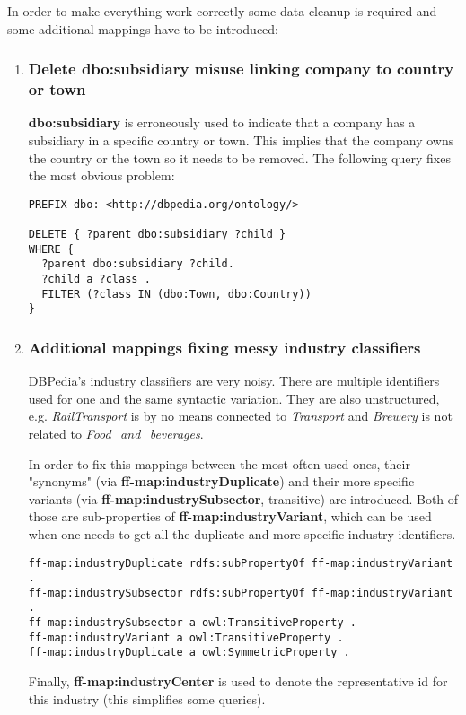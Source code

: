 In order to make everything work correctly some data cleanup is required and some additional mappings have to be introduced:
\begin{enumerate}
    \item \subsubsection {Delete dbo:subsidiary misuse linking company to country or town}
    
    \textbf{dbo:subsidiary} is erroneously used to indicate that a company has a subsidiary in a specific country or town. This implies that the company owns the country or the town so it needs to be removed. The following query fixes the most obvious problem:
    
\begin{verbatim}
PREFIX dbo: <http://dbpedia.org/ontology/>

DELETE { ?parent dbo:subsidiary ?child }
WHERE {
  ?parent dbo:subsidiary ?child.
  ?child a ?class .
  FILTER (?class IN (dbo:Town, dbo:Country))
}
\end{verbatim}

    \item \subsubsection{Additional mappings fixing messy industry classifiers}
    DBPedia's industry classifiers are very noisy. There are multiple identifiers used for one and the same syntactic variation. They are also unstructured, e.g. \textit{RailTransport} is by no means connected to \textit{Transport} and \textit{Brewery} is not related to \textit{Food\_and\_beverages}.
    
    In order to fix this mappings between the most often used ones, their "synonyms" (via \textbf{ff-map:industryDuplicate}) and their more specific variants (via \textbf{ff-map:industrySubsector}, transitive) are introduced. Both of those are sub-properties of \textbf{ff-map:industryVariant}, which can be used when one needs to get all the duplicate and more specific industry identifiers.
\begin{verbatim}
ff-map:industryDuplicate rdfs:subPropertyOf ff-map:industryVariant .
ff-map:industrySubsector rdfs:subPropertyOf ff-map:industryVariant .
ff-map:industrySubsector a owl:TransitiveProperty .
ff-map:industryVariant a owl:TransitiveProperty .
ff-map:industryDuplicate a owl:SymmetricProperty .
\end{verbatim}
    Finally, \textbf{ff-map:industryCenter} is used to denote the representative id for this industry (this simplifies some queries).
    

\end{enumerate}
